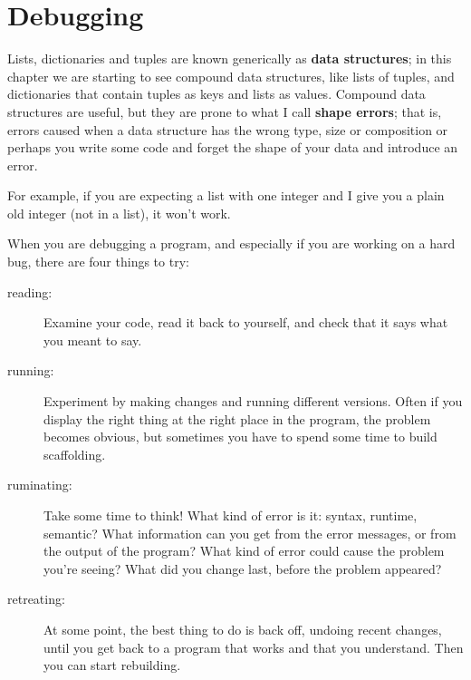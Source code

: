 

\section{Debugging}


Lists, dictionaries and tuples are known generically as {\bf data
  structures}; in this chapter we are starting to see compound data
structures, like lists of tuples, and dictionaries that contain tuples
as keys and lists as values.  Compound data structures are useful, but
they are prone to what I call {\bf shape errors}; that is, errors
caused when a data structure has the wrong type, size or composition
or perhaps you write some code and forget the shape of your data
and introduce an error.

For example, if you are expecting a list with one integer and I
give you a plain old integer (not in a list), it won't work.

When you are debugging a program, and especially if you are
working on a hard bug, there are four things to try:

\begin{description}

\item[reading:] Examine your code, read it back to yourself, and
check that it says what you meant to say.

\item[running:] Experiment by making changes and running different
versions.  Often if you display the right thing at the right place
in the program, the problem becomes obvious, but sometimes you have to
spend some time to build scaffolding.

\item[ruminating:] Take some time to think!  What kind of error
is it: syntax, runtime, semantic?  What information can you get from
the error messages, or from the output of the program?  What kind of
error could cause the problem you're seeing?  What did you change
last, before the problem appeared?

\item[retreating:] At some point, the best thing to do is back
off, undoing recent changes, until you get back to a program that
works and that you understand.  Then you can start rebuilding.

\end{description}

